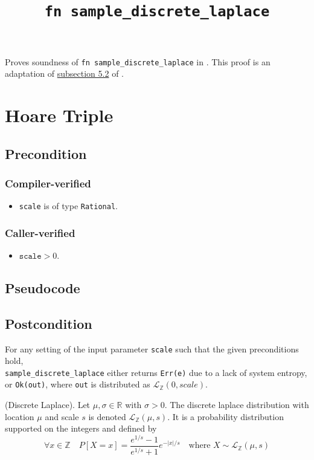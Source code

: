 \documentclass{article}
\title{\texttt{fn sample\_discrete\_laplace}}
\author{\MichaelShoemateAuthor}
\begin{document}
\maketitle
\contrib
Proves soundness of \texttt{fn sample\_discrete\_laplace} in .
This proof is an adaptation of \href{https://arxiv.org/pdf/2004.00010.pdf#subsection.5.2}{subsection 5.2} of \cite{CKS20}.

\section{Hoare Triple}
\subsection*{Precondition}
\subsubsection*{Compiler-verified}
\begin{itemize}
    \item \texttt{scale} is of type \texttt{Rational}.
\end{itemize}

\subsubsection*{Caller-verified}
\begin{itemize}
    \item $\texttt{scale} > 0$.
\end{itemize}

\subsection*{Pseudocode}


\subsection*{Postcondition}
\begin{theorem}
\label{postcondition}
For any setting of the input parameter \texttt{scale} such that the given preconditions hold, \\
\texttt{sample\_discrete\_laplace} either returns \texttt{Err(e)} due to a lack of system entropy,
or \texttt{Ok(out)}, where \texttt{out} is distributed as $\mathcal{L}_\mathbb{Z}(0, scale)$.
\end{theorem}
\begin{definition} \cite{BV17}
    (Discrete Laplace). Let $\mu, \sigma \in \mathbb{R}$ with $\sigma > 0$.
    The discrete laplace distribution with location $\mu$ and scale $s$ is denoted $\mathcal{L}_\mathbb{Z}(\mu, s)$.
    It is a probability distribution supported on the integers and defined by
    \begin{equation*}
        \forall x \in \mathbb{Z} \quad  P[X = x] = \frac{e^{1/s} - 1}{e^{1/s} + 1} e^{-|x|/s} \quad \text{where } X \sim \mathcal{L}_\mathbb{Z}(\mu, s)
    \end{equation*}
\end{definition}
\end{document}
